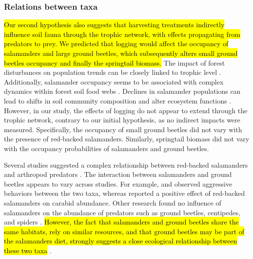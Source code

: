 \subsubsection*{Relations between taxa}
\label{disc:relations_between_taxa}

\hl{Our second hypothesis also suggests that harvesting treatments indirectly influence soil fauna through the trophic network, with effects propagating from predators to prey. 
We predicted that logging would affect the occupancy of salamanders and large ground beetles, which subsequently alters small ground beetles occupancy and finally the springtail biomass.} 
The impact of forest disturbances on population trends can be closely linked to trophic level \citep{Gotelli2006FoodWebModels,Nolte2019Habitatspecialization}. 
Additionally, salamander occupancy seems to be associated with complex dynamics within forest soil food webs \citep{baileyEstimatingSiteOccupancy2004,Walton2006Salamandersforestfloor,Rooney2000impactsalamander}. 
Declines in salamander populations can lead to shifts in soil community composition and alter ecosystem functions \citep{Hairston1987evolutioncompeting,Wyman1998Experimentalassessment,Rooney2000impactsalamander,Walton2005Contrastingeffects}. 
However, in our study, the effects of logging do not appear to extend through the trophic network, contrary to our initial hypothesis, as no indirect impacts were measured.
Specifically, the occupancy of small ground beetles did not vary with the presence of red-backed salamanders. 
Similarly, springtail biomass did not vary with the occupancy probabilities of salamanders and ground beetles. 

Several studies suggested a complex relationship between red-backed salamanders and arthropod predators \citep{Gall2003BehavioralInteractions,Walton2006Salamandersforestfloor,Hickerson2018Behavioralinteractions}. 
The interaction between salamanders and ground beetles appears to vary across studies.  
For example, \cite{Gall2003BehavioralInteractions} and \cite{Ovaska1988Predatorybehavior} observed aggressive behaviors between the two taxa, whereas \cite{Hickerson2012Interactionsforestfloor} reported a positive effect of red-backed salamanders on carabid abundance. 
Other research found no influence of salamanders on the abundance of predators such as ground beetles, centipedes, and spiders \citep{Hocking2013Effectsexperimental}. 
\hl{However, the fact that salamanders and ground beetles share the same habitats, rely on similar resources, and that ground beetles may be part of the salamanders diet, strongly suggests a close ecological relationship between these two taxa} \citep{Jaeger1980MicrohabitatsTerrestrial,loveiEcologyBehaviorGround1996}.

